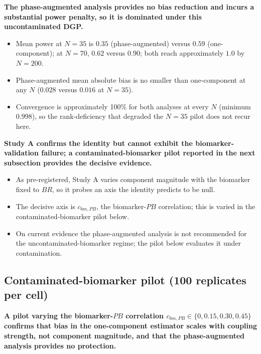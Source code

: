 \documentclass[
  11pt,
]{article}
\begin{document}
\textbf{The phase-augmented analysis provides no bias reduction and incurs a substantial power penalty, so it is dominated under this uncontaminated DGP.}

\begin{itemize}\setlength{\itemsep}{2pt}\setlength{\parskip}{0pt}
\item Mean power at $N=35$ is $0.35$ (phase-augmented) versus $0.59$ (one-component); at $N=70$, $0.62$ versus $0.90$; both reach approximately $1.0$ by $N=200$.
\item Phase-augmented mean absolute bias is no smaller than one-component at any $N$ ($0.028$ versus $0.016$ at $N=35$).
\item Convergence is approximately 100\% for both analyses at every $N$ (minimum $0.998$), so the rank-deficiency that degraded the $N=35$ pilot does not recur here.
\end{itemize}

\textbf{Study A confirms the identity but cannot exhibit the biomarker-validation failure; a contaminated-biomarker pilot reported in the next subsection provides the decisive evidence.}

\begin{itemize}\setlength{\itemsep}{2pt}\setlength{\parskip}{0pt}
\item As pre-registered, Study A varies component magnitude with the biomarker fixed to $BR$, so it probes an axis the identity predicts to be null.
\item The decisive axis is $c_{bm,PB}$, the biomarker-$PB$ correlation; this is varied in the contaminated-biomarker pilot below.
\item On current evidence the phase-augmented analysis is not recommended for the uncontaminated-biomarker regime; the pilot below evaluates it under contamination.
\end{itemize}

\subsection{Contaminated-biomarker pilot (100 replicates per cell)}\label{contaminated-biomarker-pilot-100-replicates-per-cell}

\textbf{A pilot varying the biomarker-$PB$ correlation $c_{bm,PB}
\in \{0, 0.15, 0.30, 0.45\}$ confirms that bias in the
one-component estimator scales with coupling strength, not
component magnitude, and that the phase-augmented analysis
provides no protection.}
\end{document}
